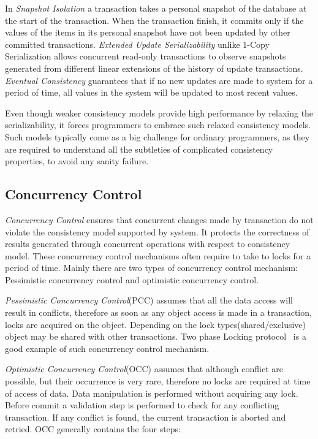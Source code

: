 \documentclass[12pt,english]{report}
\begin{document}
In \textit{Snapshot Isolation} a transaction takes a personal snapshot of the database at the start of the transaction. When the transaction finish, it commits only if the values of the items in its personal snapshot have not been updated by other committed transactions. \textit{Extended Update Serializability} unlike 1-Copy Serialization allows concurrent read-only transactions to observe snapshots generated from different linear extensions of the history of update transactions. \textit{Eventual Consistency} guarantees that if no new updates are made to system for a period of time, all values in the system will be updated to most recent values.

Even though weaker consistency models provide high performance by relaxing the serializability, it forces programmers to embrace such relaxed consistency models. Such models typically come as a big challenge for ordinary programmers, as they are required to understand all the subtleties of complicated consistency properties, to avoid any sanity failure.

\subsection{Concurrency Control} 

\textit{Concurrency Control} ensures that concurrent changes made by transaction do not violate the consistency model supported by system. It protects the correctness of results generated through concurrent operations with respect to consistency model. These concurrency control mechanisms often require to take to locks for a period of time. Mainly there are two types of concurrency control mechanism: Pessimistic concurrency control and optimistic concurrency control.

\textit{Pessimistic Concurrency Control}(PCC) assumes that all the data access will result in conflicts, therefore as soon as any object access is made in a transaction, locks are acquired on the object. Depending on the lock types(shared/exclusive) object may be shared with other transactions. Two phase Locking protocol~\cite{2PL:lin1983basic} is a good example of such concurrency control mechanism.  

\textit{Optimistic Concurrency Control}(OCC) assumes that although conflict are possible, but their occurrence is very rare, therefore no locks are required at time of access of data. Data manipulation is performed without acquiring any lock. Before commit a validation step is performed to check for any conflicting transaction. If any conflict is found, the current transaction is aborted and retried. OCC generally contains the four steps:
\end{document}
